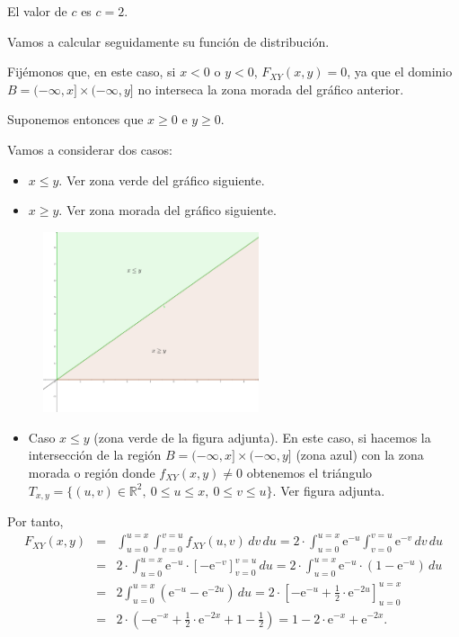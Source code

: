 \documentclass[]{book}
\providecommand{\tightlist}{%
  \setlength{\itemsep}{0pt}\setlength{\parskip}{0pt}}
\begin{document}
El valor de \(c\) es \(c=2\).

Vamos a calcular seguidamente su función de distribución.

Fijémonos que, en este caso, si \(x<0\) o \(y<0\), \(F_{XY}(x,y)=0\), ya que el dominio \(B=(-\infty,x]\times (-\infty,y]\) no interseca la zona morada del gráfico anterior.

Suponemos entonces que \(x\geq 0\) e \(y\geq 0\).

Vamos a considerar dos casos:

\begin{itemize}
\item
  \(x\leq y\). Ver zona verde del gráfico siguiente.
\item
  \(x\geq y\). Ver zona morada del gráfico siguiente.
\end{itemize}

\begin{figure}
\includegraphics[width=2.5in]{Images/Ejemplo2Bidi2} \end{figure}

\begin{itemize}
\tightlist
\item
  Caso \(x\leq y\) (zona verde de la figura adjunta). En este caso, si hacemos la intersección de la región \(B=(-\infty,x]\times (-\infty,y]\) (zona azul) con la zona morada o región donde \(f_{XY}(x,y)\neq 0\) obtenemos el triángulo \(T_{x,y}=\{(u,v)\in\mathbb{R}^2,\ 0\leq u\leq x,\ 0\leq v\leq u\}.\) Ver figura adjunta.
\end{itemize}

Por tanto,
\[
\begin{array}{lcr}
F_{XY}(x,y) & = & \int_{u=0}^{u=x}\int_{v=0}^{v=u} f_{XY}(u,v)\,dv\,du= 2 \cdot\int_{u=0}^{u=x} \mathrm{e}^{-u}\int_{v=0}^{v=u}  \mathrm{e}^{-v}\,dv\,du\\ &  = & 
2 \cdot\int_{u=0}^{u=x} \mathrm{e}^{-u}\cdot\left[-\mathrm{e}^{-v}\right]_{v=0}^{v=u}\, du =  2 \cdot\int_{u=0}^{u=x} \mathrm{e}^{-u} \cdot (1-\mathrm{e}^{-u})\, du 
\\ & = & 2 \int_{u=0}^{u=x} \left(\mathrm{e}^{-u}-\mathrm{e}^{-2u}\right)\, du=2\cdot \left[-\mathrm{e}^{-u}+\frac{1}{2}\cdot\mathrm{e}^{-2u}\right]_{u=0}^{u=x}  \\ & = &
2\cdot\left(-\mathrm{e}^{-x}+\frac{1}{2}\cdot\mathrm{e}^{-2x}+1-\frac{1}{2}\right) =1-2\cdot\mathrm{e}^{-x}+\mathrm{e}^{-2x}.
\end{array}
\]
\end{document}
